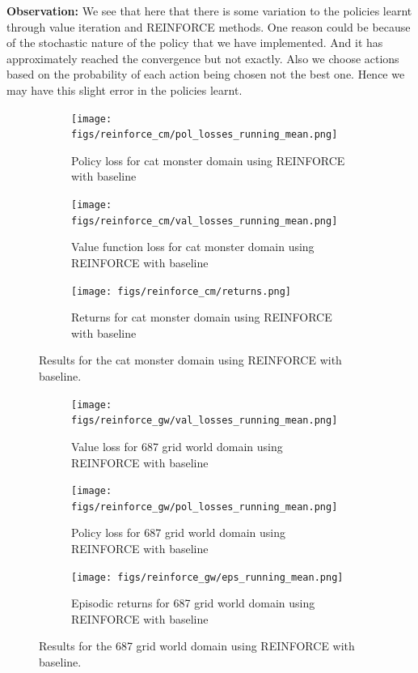 \documentclass{article}
\begin{document}
\textbf{Observation:} We see that here that there is some variation to the policies learnt through value iteration and REINFORCE methods. One reason could be because of the stochastic nature of the policy that we have implemented. And it has approximately reached the convergence but not exactly. Also we choose actions based on the probability of each action being chosen not the best one. Hence we may have this slight error in the policies learnt.

\begin{figure}[h!]
    \centering
    \begin{subfigure}{0.3\textwidth}
        \texttt{[image: figs/reinforce\_cm/pol\_losses\_running\_mean.png]}
        \caption{Policy loss for cat monster domain using REINFORCE with baseline}
        \label{fig:5}
    \end{subfigure}
    \begin{subfigure}{0.3\textwidth}
        \texttt{[image: figs/reinforce\_cm/val\_losses\_running\_mean.png]}
        \caption{Value function loss for cat monster domain using REINFORCE with baseline}
        \label{fig:6}
    \end{subfigure}
    \begin{subfigure}{0.3\textwidth}
        \texttt{[image: figs/reinforce\_cm/returns.png]}
        \caption{Returns for cat monster domain using REINFORCE with baseline}
        \label{fig:7}
    \end{subfigure}
    \caption{Results for the cat monster domain using REINFORCE with baseline.}
    \label{fig:combined}
\end{figure}


\begin{figure}[h!]
    \centering
    \begin{subfigure}{0.3\textwidth}
        \texttt{[image: figs/reinforce\_gw/val\_losses\_running\_mean.png]}
        \caption{Value loss for 687 grid world domain using REINFORCE with baseline}
        \label{fig:9}
    \end{subfigure}
    \begin{subfigure}{0.3\textwidth}
        \texttt{[image: figs/reinforce\_gw/pol\_losses\_running\_mean.png]}
        \caption{Policy loss for 687 grid world domain using REINFORCE with baseline}
        \label{fig:8}
    \end{subfigure}
    \begin{subfigure}{0.3\textwidth}
        \texttt{[image: figs/reinforce\_gw/eps\_running\_mean.png]}
        \caption{Episodic returns for 687 grid world domain using REINFORCE with baseline}
        \label{fig:7}
    \end{subfigure}
    \caption{Results for the 687 grid world domain using REINFORCE with baseline.}
    \label{fig:gw_combined}
\end{figure}
\end{document}

